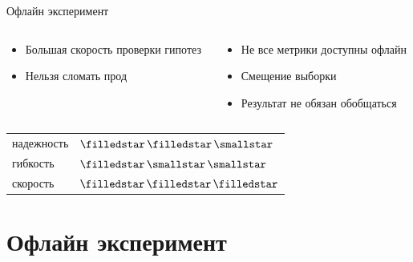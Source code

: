 \documentclass[11pt,aspectratio=169,handout]{beamer}
\begin{document}
\begin{frame}{Офлайн эксперимент}

\begin{columns}
\begin{column}{0.47\textwidth}
   \begin{tcolorbox}[colback=info!5,colframe=info!80,title=Плюсы]
      \begin{itemize}
      \item Большая скорость проверки гипотез
      \item Нельзя сломать прод
      \end{itemize}
    \end{tcolorbox}
\end{column}
\begin{column}{0.47\textwidth}
    \begin{tcolorbox}[colback=warn!5,colframe=warn!80,title=Минусы]
      \begin{itemize}
       \item Не все метрики доступны офлайн
       \item Смещение выборки
       \item Результат не обязан обобщаться
      \end{itemize}
    \end{tcolorbox}
\end{column}
\end{columns}

\pause
\vfill

\begin{large}
\begin{tabular}{ll}
надежность & \color{red}$\filledstar\,\filledstar\,\smallstar$ \\
гибкость & \color{red}$\filledstar\,\smallstar\,\smallstar$ \\
скорость & \color{red}$\filledstar\,\filledstar\,\filledstar$ \\
\end{tabular}
\end{large}

\end{frame}

\section{Офлайн эксперимент}
\end{document}
